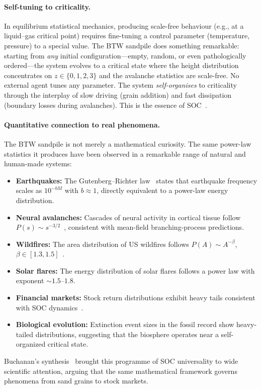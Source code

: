 \documentclass[preprint,12pt]{elsarticle}
\begin{document}
\paragraph{Self-tuning to criticality.}
In equilibrium statistical mechanics, producing scale-free behaviour
(e.g., at a liquid--gas critical point) requires fine-tuning a control
parameter (temperature, pressure) to a special value.
The BTW sandpile does something remarkable: starting from \emph{any}
initial configuration---empty, random, or even pathologically
ordered---the system evolves to a critical state where the height
distribution concentrates on $z\in\{0,1,2,3\}$ and the avalanche
statistics are scale-free.
No external agent tunes any parameter.
The system \emph{self-organises} to criticality through the interplay
of slow driving (grain addition) and fast dissipation (boundary losses
during avalanches).
This is the essence of SOC~\cite{Bak1996,Jensen1998}.

\paragraph{Quantitative connection to real phenomena.}
The BTW sandpile is not merely a mathematical curiosity.
The same power-law statistics it produces have been observed in a
remarkable range of natural and human-made systems:
\begin{itemize}[leftmargin=2em]
  \item \textbf{Earthquakes:} The Gutenberg--Richter law~\cite{Gutenberg1944}
        states that earthquake frequency scales as $10^{-bM}$ with
        $b\approx1$, directly equivalent to a power-law energy
        distribution.
  \item \textbf{Neural avalanches:} Cascades of neural activity in
        cortical tissue follow $P(s)\sim s^{-3/2}$~\cite{Beggs2003},
        consistent with mean-field branching-process predictions.
  \item \textbf{Wildfires:} The area distribution of US wildfires follows
        $P(A)\sim A^{-\beta}$, $\beta\in[1.3,1.5]$~\cite{Malamud1998}.
  \item \textbf{Solar flares:} The energy distribution of solar flares
        follows a power law with exponent $\sim1.5$--$1.8$.
  \item \textbf{Financial markets:} Stock return distributions exhibit
        heavy tails consistent with SOC dynamics~\cite{Sornette2006}.
  \item \textbf{Biological evolution:} Extinction event sizes in the
        fossil record show heavy-tailed distributions, suggesting that
        the biosphere operates near a self-organized critical state.
\end{itemize}
Buchanan's synthesis~\cite{Buchanan2000} brought this programme of
SOC universality to wide scientific attention, arguing that the same
mathematical framework governs phenomena from sand grains to stock
markets.
\end{document}
